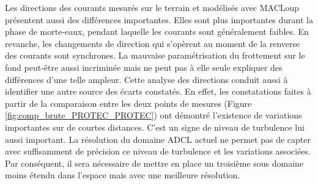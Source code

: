 \documentclass[10pt,a4paper,titlepage]{article}
\begin{document}

Les directions des courants mesurés sur le terrain et modélisés avec MACLoup présentent aussi des différences importantes.
Elles sont plus importantes durant la phase de morte-eaux, pendant laquelle les courants sont généralement faibles.
En revanche, les changements de direction qui s'opèrent au moment de la renverse des courants sont synchrones.
La mauvaise paramétrisation du frottement sur le fond peut-être aussi incriminée mais ne peut pas à elle seule expliquer des différences d'une telle ampleur.
Cette analyse des directions conduit aussi à identifier une autre source des écarts constatés.
En effet, les constatations faites à partir de la comparaison entre les deux points de mesures (Figure \ref{fig:comp_brute_PROTEC_PROTEC}) ont démontré l'existence de variations importantes sur de courtes distances.
C'est un signe de niveau de turbulence lui aussi important.
La résolution du domaine ADCL actuel ne permet pas de capter avec suffisamment de précision ce niveau de turbulence et les variations associées.
Par conséquent, il sera nécessaire de mettre en place un troisième sous domaine moins étendu dans l'espace mais avec une meilleure résolution.
\end{document}
